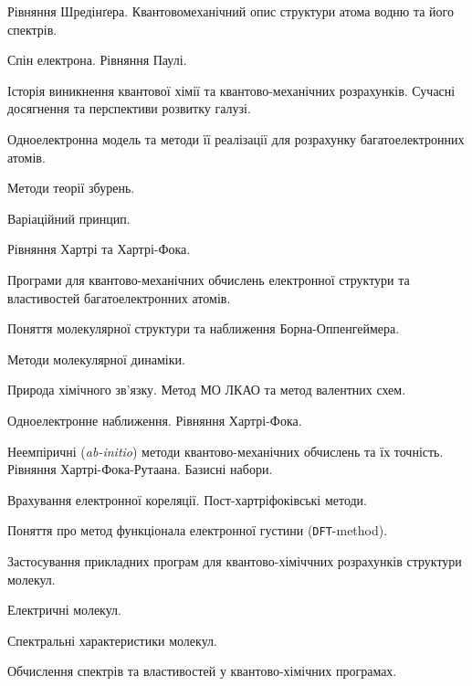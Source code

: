 \documentclass{Syllabus}
\begin{document}
\begin{Rozdil}
 \label{R:predmet}
    \begin{Rozdil}
        \item Рівняння Шредінґера. Квантовомеханічний опис структури атома водню та його спектрів.
        \item Спін електрона. Рівняння Паулі.
        \item Історія виникнення квантової хімії та квантово-механічних розрахунків. Сучасні досягнення та перспективи розвитку галузі.
    \end{Rozdil}
\label{R:bagatoelekronni}
    \begin{Rozdil}
        \item Одноелектронна модель та методи її реалізації для розрахунку багатоелектронних атомів.
        \item Методи теорії збурень.
        \item Варіаційний принцип.
        \item Рівняння Хартрі та Хартрі-Фока.
        \item Програми для квантово-механічних обчислень електронної структури та властивостей багатоелектронних атомів.
    \end{Rozdil}
 \label{R:molstructura}
    \begin{Rozdil}
       \item Поняття молекулярної структури та наближення Борна-Оппенгеймера.
       \item Методи молекулярної динаміки.
    \end{Rozdil}
 \label{R:kchmetody}
    \begin{Rozdil}
        \item Природа хімічного зв'язку. Метод МО ЛКАО та метод валентних схем.
        \item Одноелектронне наближення. Рівняння Хартрі-Фока.
        \item Неемпіричні (\emph{ab-initio}) методи квантово-механічних обчислень та їх точність. Рівняння Хартрі-Фока-Рутаана. Базисні набори.
        \item Врахування електронної кореляції. Пост-хартріфоківські методи.
        \item Поняття про метод функціонала електронної густини (\texttt{DFT}-method).
        \item Застосування прикладних програм для квантово-хіміччних розрахунків структури молекул.
    \end{Rozdil}
  \label{R:vlastyv}
    \begin{Rozdil}
        \item Електричні молекул.
        \item Спектральні характеристики молекул.
        \item Обчислення спектрів та властивостей у квантово-хімічних програмах.
    \end{Rozdil}


\end{Rozdil}
\end{document}
